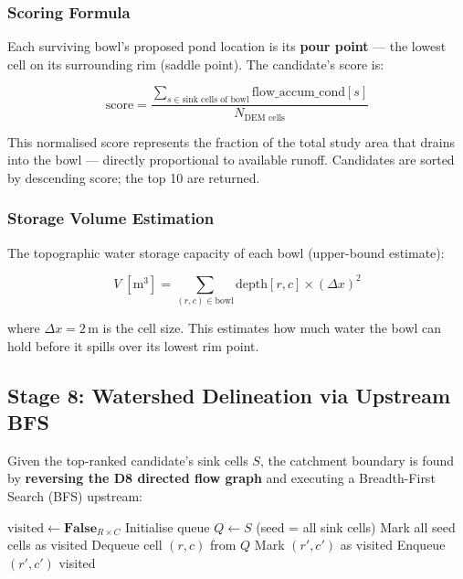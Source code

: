 \documentclass[12pt,a4paper]{article}
\begin{document}
\subsubsection{Scoring Formula}
Each surviving bowl's proposed pond location is its \textbf{pour point} --- the lowest
cell on its surrounding rim (saddle point). The candidate's score is:

\begin{equation}
    \text{score} = \frac{\displaystyle\sum_{s \in \text{sink cells of bowl}}
                         \text{flow\_accum\_cond}[s]}{N_{\text{DEM cells}}}
\end{equation}

This normalised score represents the fraction of the total study area that drains into
the bowl --- directly proportional to available runoff. Candidates are sorted by
descending score; the top 10 are returned.

\subsubsection{Storage Volume Estimation}
The topographic water storage capacity of each bowl (upper-bound estimate):

\begin{equation}
    V \;[\text{m}^3] = \sum_{(r,c) \in \text{bowl}} \text{depth}[r,c] \times (\Delta x)^2
\end{equation}

where $\Delta x = 2\,\text{m}$ is the cell size. This estimates how much water the bowl
can hold before it spills over its lowest rim point.

\subsection{Stage 8: Watershed Delineation via Upstream BFS}

Given the top-ranked candidate's sink cells $S$, the catchment boundary is found by
\textbf{reversing the D8 directed flow graph} and executing a Breadth-First Search
(BFS) upstream:

\begin{algorithm}[H]
\caption{Upstream Watershed BFS}
\begin{algorithmic}[1]
\State $\text{visited} \leftarrow \mathbf{False}_{R \times C}$ 
\State Initialise queue $Q \leftarrow S$ (seed = all sink cells)
\State Mark all seed cells as visited
    \State Dequeue cell $(r, c)$ from $Q$
            \State Mark $(r', c')$ as visited
            \State Enqueue $(r', c')$
        \EndIf
    \EndFor
\EndWhile
\State \Return visited
\end{algorithmic}
\end{algorithm}
\end{document}
